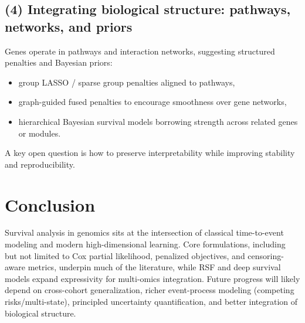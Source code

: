 \documentclass[11pt]{article}
\begin{document}
\subsection{(4) Integrating biological structure: pathways, networks, and priors}
Genes operate in pathways and interaction networks, suggesting structured penalties and Bayesian priors:
\begin{itemize}
  \item group LASSO / sparse group penalties aligned to pathways,
  \item graph-guided fused penalties to encourage smoothness over gene networks,
  \item hierarchical Bayesian survival models borrowing strength across related genes or modules.
\end{itemize}
A key open question is how to preserve interpretability while improving stability and reproducibility.


\section{Conclusion}
Survival analysis in genomics sits at the intersection of classical time-to-event modeling and modern high-dimensional learning. Core formulations, including but not limited to Cox partial likelihood, penalized objectives, and censoring-aware metrics, underpin much of the literature, while RSF and deep survival models expand expressivity for multi-omics integration. Future progress will likely depend on cross-cohort generalization, richer event-process modeling (competing risks/multi-state), principled uncertainty quantification, and better integration of biological structure.

\newpage
\end{document}
